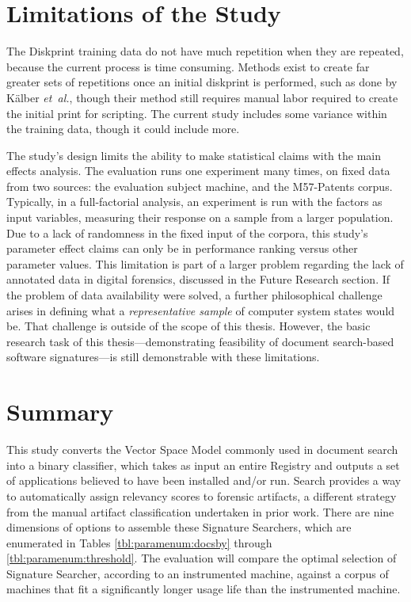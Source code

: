 \documentclass[11pt]{ucthesis}
\theoremstyle{plain}
\theoremstyle{definition}
\newcommand{\etal}{\emph{et~al.}\xspace}
\begin{document}
\section{Limitations of the Study}
\label{sec:limitations}

The Diskprint training data do not have much repetition when they are repeated, because the current process is time consuming.  Methods exist to create far greater sets of repetitions once an initial diskprint is performed, such as done by K\"alber \etal \cite{kalber:imf13}, though their method still requires manual labor required to create the initial print for scripting.  The current study includes some variance within the training data, though it could include more.

The study's design limits the ability to make statistical claims with the main effects analysis.  The evaluation runs one experiment many times, on fixed data from two sources: the evaluation subject machine, and the M57-Patents corpus.  Typically, in a full-factorial analysis, an experiment is run with the factors as input variables, measuring their response on a sample from a larger population.  Due to a lack of randomness in the fixed input of the corpora, this study's parameter effect claims can only be in performance ranking versus other parameter values.  This limitation is part of a larger problem regarding the lack of annotated data in digital forensics, discussed in the Future Research section.  If the problem of data availability were solved, a further philosophical challenge arises in defining what a \emph{representative sample} of computer system states would be.  That challenge is outside of the scope of this thesis.  However, the basic research task of this thesis---demonstrating feasibility of document search-based software signatures---is still demonstrable with these limitations.


\section{Summary}

This study converts the Vector Space Model commonly used in document search into a binary classifier, which takes as input an entire Registry and outputs a set of applications believed to have been installed and/or run.  Search provides a way to automatically assign relevancy scores to forensic artifacts, a different strategy from the manual artifact classification undertaken in prior work.  There are nine dimensions of options to assemble these Signature Searchers, which are enumerated in Tables \ref{tbl:paramenum:docsby} through \ref{tbl:paramenum:threshold}.  The evaluation will compare the optimal selection of Signature Searcher, according to an instrumented machine, against a corpus of machines that fit a significantly longer usage life than the instrumented machine.
\end{document}
